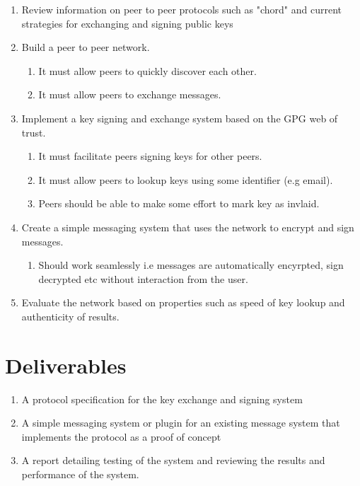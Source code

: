 \documentclass[
10pt, %
a4paper, %
oneside, %
headinclude,footinclude, %
BCOR5mm, %
]{scrartcl}
\begin{document}
\begin{enumerate}
  \item Review information on peer to peer protocols such as "chord" and current strategies for exchanging and signing public keys
  \item Build a peer to peer network.
    \begin{enumerate}
      \item It must allow peers to quickly discover each other.
      \item It must allow peers to exchange messages.
    \end{enumerate}
  \item Implement a key signing and exchange system based on the GPG web of trust.
    \begin{enumerate}
      \item It must facilitate peers signing keys for other peers.
      \item It must allow peers to lookup keys using some identifier (e.g email).
      \item Peers should be able to make some effort to mark key as invlaid.
    \end{enumerate}
  \item Create a simple messaging system that uses the network to encrypt and sign messages.
    \begin{enumerate}
      \item Should work seamlessly i.e messages are automatically encyrpted, sign decrypted etc without interaction from the user.
    \end{enumerate}
  \item Evaluate the network based on properties such as speed of key lookup and authenticity of results.
\end{enumerate}

\section{Deliverables}
  \begin{enumerate}
    \item A protocol specification for the key exchange and signing system
    \item A simple messaging system or plugin for an existing message system that implements the protocol as a proof of concept
    \item A report detailing testing of the system and reviewing the results and performance of the system.
  \end{enumerate}
\end{document}
